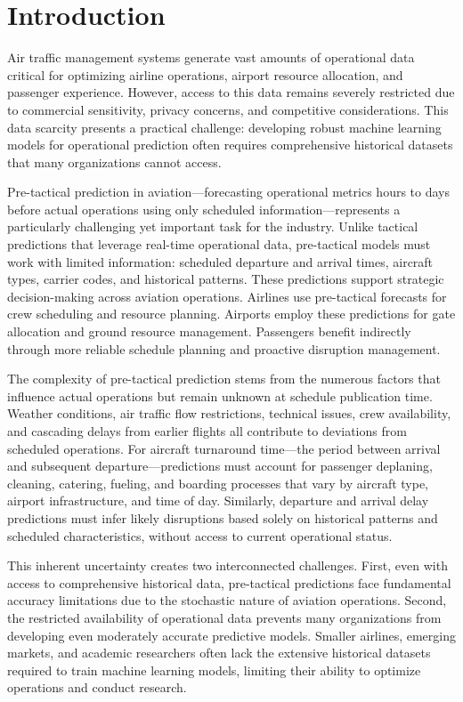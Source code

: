 \documentclass[conference]{IEEEtran}
\begin{document}
\section{Introduction}

Air traffic management systems generate vast amounts of operational data critical for optimizing airline operations, airport resource allocation, and passenger experience. However, access to this data remains severely restricted due to commercial sensitivity, privacy concerns, and competitive considerations. This data scarcity presents a practical challenge: developing robust machine learning models for operational prediction often requires comprehensive historical datasets that many organizations cannot access.

Pre-tactical prediction in aviation—forecasting operational metrics hours to days before actual operations using only scheduled information—represents a particularly challenging yet important task for the industry. Unlike tactical predictions that leverage real-time operational data, pre-tactical models must work with limited information: scheduled departure and arrival times, aircraft types, carrier codes, and historical patterns. These predictions support strategic decision-making across aviation operations. Airlines use pre-tactical forecasts for crew scheduling and resource planning. Airports employ these predictions for gate allocation and ground resource management. Passengers benefit indirectly through more reliable schedule planning and proactive disruption management.

The complexity of pre-tactical prediction stems from the numerous factors that influence actual operations but remain unknown at schedule publication time. Weather conditions, air traffic flow restrictions, technical issues, crew availability, and cascading delays from earlier flights all contribute to deviations from scheduled operations. For aircraft turnaround time—the period between arrival and subsequent departure—predictions must account for passenger deplaning, cleaning, catering, fueling, and boarding processes that vary by aircraft type, airport infrastructure, and time of day. Similarly, departure and arrival delay predictions must infer likely disruptions based solely on historical patterns and scheduled characteristics, without access to current operational status.

This inherent uncertainty creates two interconnected challenges. First, even with access to comprehensive historical data, pre-tactical predictions face fundamental accuracy limitations due to the stochastic nature of aviation operations. Second, the restricted availability of operational data prevents many organizations from developing even moderately accurate predictive models. Smaller airlines, emerging markets, and academic researchers often lack the extensive historical datasets required to train machine learning models, limiting their ability to optimize operations and conduct research.
\end{document}
